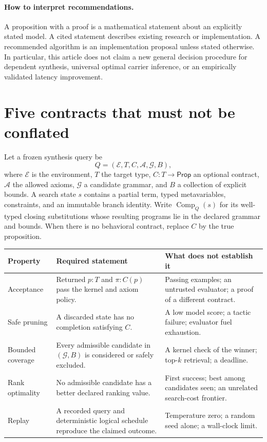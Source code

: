 \documentclass[11pt,a4paper]{article}
\newcommand{\Comp}{\operatorname{Comp}}
\theoremstyle{remark}
\begin{document}
\paragraph{How to interpret recommendations.}
A proposition with a proof is a mathematical statement about an explicitly stated model. A cited statement describes existing research or implementation. A recommended algorithm is an implementation proposal unless stated otherwise. In particular, this article does not claim a new general decision procedure for dependent synthesis, universal optimal carrier inference, or an empirically validated latency improvement.

\section{Five contracts that must not be conflated}\label{sec:contracts-five}

Let a frozen synthesis query be
\[
 Q=(\mathcal E,T,C,\mathcal A,\mathcal G,B),
\]
where $\mathcal E$ is the environment, $T$ the target type, $C:T\to\mathsf{Prop}$ an optional contract, $\mathcal A$ the allowed axioms, $\mathcal G$ a candidate grammar, and $B$ a collection of explicit bounds. A search state $s$ contains a partial term, typed metavariables, constraints, and an immutable branch identity. Write $\Comp_Q(s)$ for its well-typed closing substitutions whose resulting programs lie in the declared grammar and bounds. When there is no behavioral contract, replace $C$ by the true proposition.

\begin{longtable}{@{}P{28mm}P{65mm}P{58mm}@{}}
\toprule
Property & Required statement & What does not establish it\\
\midrule
\endhead
Acceptance & Returned $p:T$ and $\pi:C(p)$ pass the kernel and axiom policy. & Passing examples; an untrusted evaluator; a proof of a different contract.\\
Safe pruning & A discarded state has no completion satisfying $C$. & A low model score; a tactic failure; evaluator fuel exhaustion.\\
Bounded coverage & Every admissible candidate in $(\mathcal G,B)$ is considered or safely excluded. & A kernel check of the winner; top-$k$ retrieval; a deadline.\\
Rank optimality & No admissible candidate has a better declared ranking value. & First success; best among candidates seen; an unrelated search-cost frontier.\\
Replay & A recorded query and deterministic logical schedule reproduce the claimed outcome. & Temperature zero; a random seed alone; a wall-clock limit.\\
\bottomrule
\end{longtable}
\end{document}
